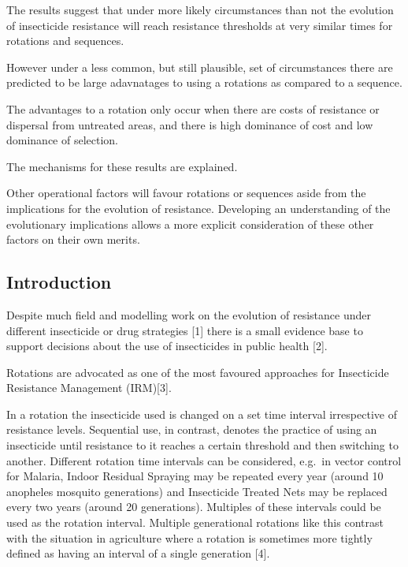\documentclass[11pt,]{article}
\begin{document}
The results suggest that under more likely circumstances than not the
evolution of insecticide resistance will reach resistance thresholds at
very similar times for rotations and sequences.

However under a less common, but still plausible, set of circumstances
there are predicted to be large adavnatages to using a rotations as
compared to a sequence.

The advantages to a rotation only occur when there are costs of
resistance or dispersal from untreated areas, and there is high
dominance of cost and low dominance of selection.

The mechanisms for these results are explained.

Other operational factors will favour rotations or sequences aside from
the implications for the evolution of resistance. Developing an
understanding of the evolutionary implications allows a more explicit
consideration of these other factors on their own merits.

\pagebreak

\subsection{Introduction}\label{introduction}

Despite much field and modelling work on the evolution of resistance
under different insecticide or drug strategies {[}1{]} there is a small
evidence base to support decisions about the use of insecticides in
public health {[}2{]}.

Rotations are advocated as one of the most favoured approaches for
Insecticide Resistance Management (IRM){[}3{]}.

In a rotation the insecticide used is changed on a set time interval
irrespective of resistance levels. Sequential use, in contrast, denotes
the practice of using an insecticide until resistance to it reaches a
certain threshold and then switching to another. Different rotation time
intervals can be considered, e.g.~in vector control for Malaria, Indoor
Residual Spraying may be repeated every year (around 10 anopheles
mosquito generations) and Insecticide Treated Nets may be replaced every
two years (around 20 generations). Multiples of these intervals could be
used as the rotation interval. Multiple generational rotations like this
contrast with the situation in agriculture where a rotation is sometimes
more tightly defined as having an interval of a single generation
{[}4{]}.
\end{document}
